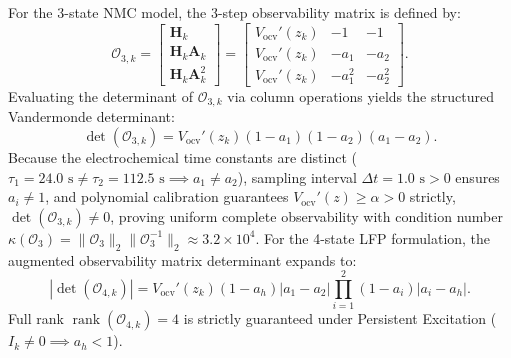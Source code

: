 \documentclass[balance,nocopyright,upint,varvw,hyphenate,barcolor=NavyBlue,nolists]{asmejour}
\begin{document}
For the 3-state NMC model, the 3-step observability matrix is defined by:
\begin{equation}\label{eqn:app_obs_nmc}
\mathcal{O}_{3,k} = \begin{bmatrix} \mathbf{H}_k \\ \mathbf{H}_k \mathbf{A}_k \\ \mathbf{H}_k \mathbf{A}_k^2 \end{bmatrix} = \begin{bmatrix} V_{\text{ocv}}'(z_k) & -1 & -1 \\ V_{\text{ocv}}'(z_k) & -a_1 & -a_2 \\ V_{\text{ocv}}'(z_k) & -a_1^2 & -a_2^2 \end{bmatrix}.
\end{equation}
Evaluating the determinant of $\mathcal{O}_{3,k}$ via column operations yields the structured Vandermonde determinant:
\begin{equation}\label{eqn:app_det_nmc}
\det(\mathcal{O}_{3,k}) = V_{\text{ocv}}'(z_k) (1 - a_1)(1 - a_2)(a_1 - a_2).
\end{equation}
Because the electrochemical time constants are distinct ($\tau_1 = 24.0\text{ s} \ne \tau_2 = 112.5\text{ s} \implies a_1 \ne a_2$), sampling interval $\Delta t = 1.0\text{ s} > 0$ ensures $a_i \ne 1$, and polynomial calibration guarantees $V_{\text{ocv}}'(z) \ge \alpha > 0$ strictly, $\det(\mathcal{O}_{3,k}) \ne 0$, proving uniform complete observability with condition number $\kappa(\mathcal{O}_3) = \|\mathcal{O}_3\|_2 \|\mathcal{O}_3^{-1}\|_2 \approx 3.2 \times 10^4$. For the 4-state LFP formulation, the augmented observability matrix determinant expands to:
\begin{equation}\label{eqn:app_det_lfp}
|\det(\mathcal{O}_{4,k})| = V_{\text{ocv}}'(z_k)(1 - a_h)|a_1 - a_2|\prod_{i=1}^2 (1 - a_i)|a_i - a_h|.
\end{equation}
Full rank $\operatorname{rank}(\mathcal{O}_{4,k}) = 4$ is strictly guaranteed under Persistent Excitation ($I_k \ne 0 \implies a_h < 1$).
\end{document}
